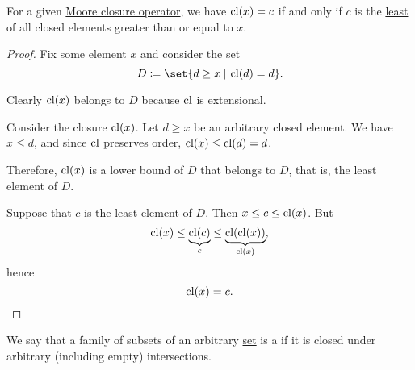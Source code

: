\begin{proposition}\label{thm:closure_operator_minimality}
  For a given \hyperref[def:moore_closure_operator]{Moore closure operator}, we have \( \operatorname{cl}(x) = c \) if and only if \( c \) is the \hyperref[def:extremal_points/greatest_and_least]{least} of all closed elements greater than or equal to \( x \).
\end{proposition}
\begin{proof}
  Fix some element \( x \) and consider the set
  \begin{equation*}
    D \coloneqq \set{ d \geq x \given \cl(d) = d }.
  \end{equation*}

  Clearly \( \operatorname{cl}(x) \) belongs to \( D \) because \( \operatorname{cl} \) is extensional.

  \SufficiencySubProof Consider the closure \( \operatorname{cl}(x) \). Let \( d \geq x \) be an arbitrary closed element. We have \( x \leq d \), and since \( \operatorname{cl} \) preserves order, \( \operatorname{cl}(x) \leq \operatorname{cl}(d) = d \).

  Therefore, \( \operatorname{cl}(x) \) is a lower bound of \( D \) that belongs to \( D \), that is, the least element of \( D \).

  \NecessitySubProof Suppose that \( c \) is the least element of \( D \). Then \( x \leq c \leq \operatorname{cl}(x) \). But
  \begin{equation*}
    \operatorname{cl}(x) \leq \underbrace{\operatorname{cl}(c)}_{c} \leq \underbrace{\operatorname{cl}(\operatorname{cl}(x))}_{\operatorname{cl}(x)},
  \end{equation*}
  hence
  \begin{equation*}
    \operatorname{cl}(x) = c.
  \end{equation*}
\end{proof}

\begin{definition}\label{def:moore_family}
  We say that a family of subsets of an arbitrary \hyperref[def:set]{set} is a  if it is closed under arbitrary (including empty) intersections.
\end{definition}


